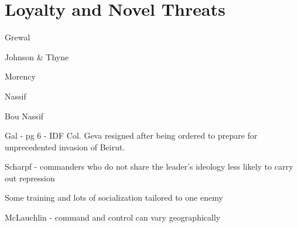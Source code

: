 \documentclass[
  12pt,
]{article}
\begin{document}
\hypertarget{loyalty-and-novel-threats}{%
\section{Loyalty and Novel Threats}\label{loyalty-and-novel-threats}}

Grewal

Johnson \& Thyne

Morency

Nassif

Bou Nassif

Gal - pg 6 - IDF Col. Geva resigned after being ordered to prepare for unprecedented invasion of Beirut.

Scharpf - commanders who do not share the leader's ideology less likely to carry out repression

Some training and lots of socialization tailored to one enemy

McLauchlin - command and control can vary geographically
\end{document}
